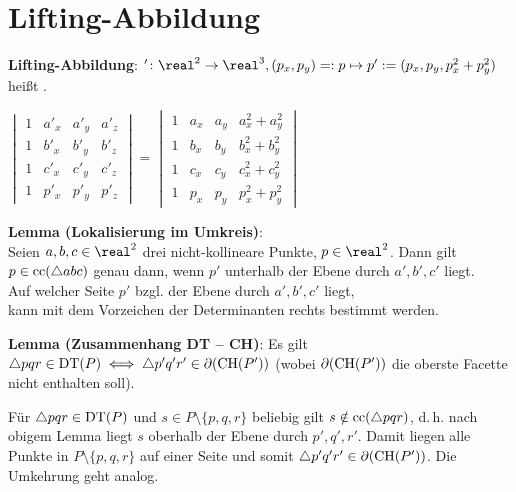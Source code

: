 \section{%
    Lifting-Abbildung%
}

\textbf{Lifting-Abbildung}:
$'\colon \real^2 \rightarrow \real^3,
(p_x, p_y) =: p \mapsto p' := (p_x, p_y, p_x^2 + p_y^2)$
heißt .

\linie

\begin{floatingfigure}[r]{65mm}
    \footnotesize$
    \begin{vmatrix}1 & a'_x & a'_y & a'_z\\1 & b'_x & b'_y & b'_z\\
    1 & c'_x & c'_y & c'_z\\1 & p'_x & p'_y & p'_z\end{vmatrix} =
    \begin{vmatrix}1 & a_x & a_y & a_x^2 + a_y^2\\1 & b_x & b_y & b_x^2 + b_y^2\\
    1 & c_x & c_y & c_x^2 + c_y^2\\1 & p_x & p_y & p_x^2 + p_y^2\end{vmatrix}$
\end{floatingfigure}

\textbf{Lemma (Lokalisierung im Umkreis)}:\\
Seien $a, b, c \in \real^2$ drei nicht-kollineare Punkte, $p \in \real^2$.
Dann gilt $p \in \operatorname{cc}(\triangle abc)$ genau dann, wenn $p'$ unterhalb der Ebene durch $a', b', c'$
liegt.\\
Auf welcher Seite $p'$ bzgl. der Ebene durch $a', b', c'$ liegt,\\
kann mit dem Vorzeichen der Determinanten rechts bestimmt werden.

\linie

\textbf{Lemma (Zusammenhang DT -- CH)}:
Es gilt $\triangle pqr \in \operatorname{DT}(P) \iff \triangle p'q'r' \in \partial(\operatorname{CH}(P'))$
(wobei $\partial(\operatorname{CH}(P'))$ die oberste Facette nicht enthalten soll).

\begin{Beweis}
    Für $\triangle pqr \in \operatorname{DT}(P)$ und $s \in P \setminus \{p, q, r\}$ beliebig gilt
    $s \notin \operatorname{cc}(\triangle pqr)$, d.\,h. nach obigem Lemma
    liegt $s$ oberhalb der Ebene durch $p', q', r'$.
    Damit liegen alle Punkte in $P \setminus \{p, q, r\}$ auf einer Seite und somit
    $\triangle p'q'r' \in \partial(\operatorname{CH}(P'))$.
    Die Umkehrung geht analog.
\end{Beweis}

